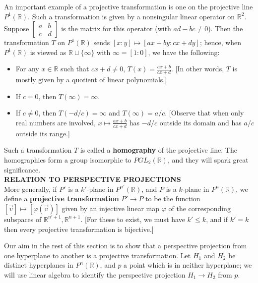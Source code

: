 \documentclass[leqno]{book}
\begin{document}
An important example of a projective transformation is one on the projective line $P^1(\mathbb R)$.  Such a transformation is given by a nonsingular linear operator on $\mathbb R^2$.  Suppose $\begin{bmatrix}a&b\\c&d\end{bmatrix}$ is the matrix for this operator (with $ad-bc\ne 0$).  Then the transformation $T$ on $P^1(\mathbb R)$ sends $[x:y]\mapsto[ax+by:cx+dy]$; hence, when $P^1(\mathbb R)$ is viewed as $\mathbb R\sqcup\{\infty\}$ with $\infty=[1:0]$, we have the following:
\begin{itemize}
\item For any $x\in\mathbb R$ such that $cx+d\ne 0$, $T(x)=\frac{ax+b}{cx+d}$.  [In other words, $T$ is mostly given by a quotient of linear polynomials.]

\item If $c=0$, then $T(\infty)=\infty$.

\item If $c\ne 0$, then $T(-d/c)=\infty$ and $T(\infty)=a/c$.  [Observe that when only real numbers are involved, $x\mapsto\frac{ax+b}{cx+d}$ has $-d/c$ outside its domain and has $a/c$ outside its range.]
\end{itemize}
Such a transformation $T$ is called a \textbf{homography} of the projective line.  The homographies form a group isomorphic to $PGL_2(\mathbb R)$, and they will spark great significance.\\ %

\noindent\textbf{RELATION TO PERSPECTIVE PROJECTIONS}\\

\noindent More generally, if $P'$ is a $k'$-plane in $P^{n'}(\mathbb R)$, and $P$ is a $k$-plane in $P^n(\mathbb R)$, we define a \textbf{projective transformation} $P'\to P$ to be the function $[\vec v]\mapsto[\varphi(\vec v)]$ given by an injective linear map $\varphi$ of the corresponding subspaces of $\mathbb R^{n'+1},\mathbb R^{n+1}$.  [For these to exist, we must have $k'\leqslant k$, and if $k'=k$ then every projective transformation is bijective.]

Our aim in the rest of this section is to show that a perspective projection from one hyperplane to another is a projective transformation.  Let $H_1$ and $H_2$ be distinct hyperplanes in $P^n(\mathbb R)$, and $p$ a point which is in neither hyperplane; we will use linear algebra to identify the perspective projection $H_1\to H_2$ from $p$.
\end{document}
